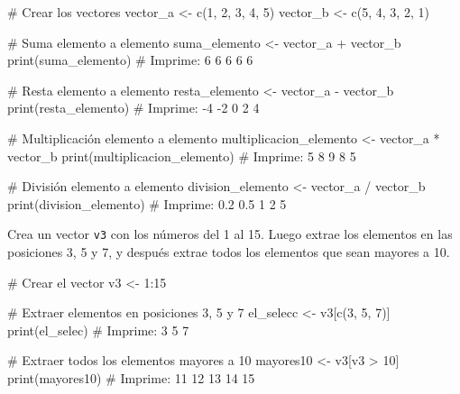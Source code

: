 \documentclass[
  letterpaper,
]{scrbook}
\newenvironment{Shaded}{\begin{snugshade}}{\end{snugshade}}
\newcommand{\CommentTok}[1]{\textcolor[rgb]{0.37,0.37,0.37}{#1}}
\newcommand{\DecValTok}[1]{\textcolor[rgb]{0.68,0.00,0.00}{#1}}
\newcommand{\FunctionTok}[1]{\textcolor[rgb]{0.28,0.35,0.67}{#1}}
\newcommand{\NormalTok}[1]{\textcolor[rgb]{0.00,0.23,0.31}{#1}}
\newcommand{\OtherTok}[1]{\textcolor[rgb]{0.00,0.23,0.31}{#1}}
\newcommand{\SpecialCharTok}[1]{\textcolor[rgb]{0.37,0.37,0.37}{#1}}
\begin{document}
\begin{Shaded}
\begin{Highlighting}[]
\CommentTok{\# Crear los vectores}
\NormalTok{vector\_a }\OtherTok{\textless{}{-}} \FunctionTok{c}\NormalTok{(}\DecValTok{1}\NormalTok{, }\DecValTok{2}\NormalTok{, }\DecValTok{3}\NormalTok{, }\DecValTok{4}\NormalTok{, }\DecValTok{5}\NormalTok{)}
\NormalTok{vector\_b }\OtherTok{\textless{}{-}} \FunctionTok{c}\NormalTok{(}\DecValTok{5}\NormalTok{, }\DecValTok{4}\NormalTok{, }\DecValTok{3}\NormalTok{, }\DecValTok{2}\NormalTok{, }\DecValTok{1}\NormalTok{)}

\CommentTok{\# Suma elemento a elemento}
\NormalTok{suma\_elemento }\OtherTok{\textless{}{-}}\NormalTok{ vector\_a }\SpecialCharTok{+}\NormalTok{ vector\_b}
\FunctionTok{print}\NormalTok{(suma\_elemento)  }\CommentTok{\# Imprime: 6 6 6 6 6}

\CommentTok{\# Resta elemento a elemento}
\NormalTok{resta\_elemento }\OtherTok{\textless{}{-}}\NormalTok{ vector\_a }\SpecialCharTok{{-}}\NormalTok{ vector\_b}
\FunctionTok{print}\NormalTok{(resta\_elemento)  }\CommentTok{\# Imprime: {-}4 {-}2 0 2 4}

\CommentTok{\# Multiplicación elemento a elemento}
\NormalTok{multiplicacion\_elemento }\OtherTok{\textless{}{-}}\NormalTok{ vector\_a }\SpecialCharTok{*}\NormalTok{ vector\_b}
\FunctionTok{print}\NormalTok{(multiplicacion\_elemento)  }\CommentTok{\# Imprime: 5 8 9 8 5}

\CommentTok{\# División elemento a elemento}
\NormalTok{division\_elemento }\OtherTok{\textless{}{-}}\NormalTok{ vector\_a }\SpecialCharTok{/}\NormalTok{ vector\_b}
\FunctionTok{print}\NormalTok{(division\_elemento)  }\CommentTok{\# Imprime: 0.2 0.5 1 2 5}
\end{Highlighting}
\end{Shaded}

Crea un vector \texttt{v3} con los números del 1 al 15. Luego extrae los
elementos en las posiciones 3, 5 y 7, y después extrae todos los
elementos que sean mayores a 10.

\begin{Shaded}
\begin{Highlighting}[]
\CommentTok{\# Crear el vector}
\NormalTok{v3 }\OtherTok{\textless{}{-}} \DecValTok{1}\SpecialCharTok{:}\DecValTok{15}

\CommentTok{\# Extraer elementos en posiciones 3, 5 y 7}
\NormalTok{el\_selecc }\OtherTok{\textless{}{-}}\NormalTok{ v3[}\FunctionTok{c}\NormalTok{(}\DecValTok{3}\NormalTok{, }\DecValTok{5}\NormalTok{, }\DecValTok{7}\NormalTok{)]}
\FunctionTok{print}\NormalTok{(el\_selec)  }\CommentTok{\# Imprime: 3 5 7}

\CommentTok{\# Extraer todos los elementos mayores a 10}
\NormalTok{mayores10 }\OtherTok{\textless{}{-}}\NormalTok{ v3[v3 }\SpecialCharTok{\textgreater{}} \DecValTok{10}\NormalTok{]}
\FunctionTok{print}\NormalTok{(mayores10)  }\CommentTok{\# Imprime: 11 12 13 14 15}
\end{Highlighting}
\end{Shaded}
\end{document}
